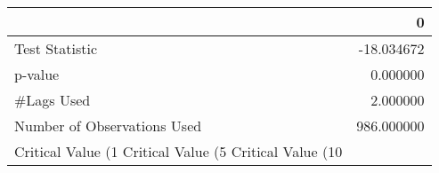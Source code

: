 \begin{tabular}{lr}
\toprule
 & 0 \\
\midrule
Test Statistic & -18.034672 \\
p-value & 0.000000 \\
#Lags Used & 2.000000 \\
Number of Observations Used & 986.000000 \\
Critical Value (1%
Critical Value (5%
Critical Value (10%
\bottomrule
\end{tabular}
